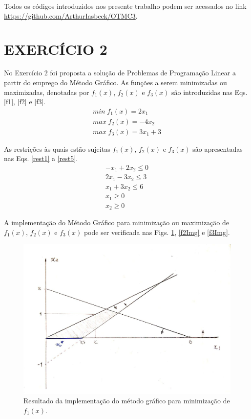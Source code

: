 \documentclass[12pt]{article}
\begin{document}
	Todos os códigos introduzidos nos presente trabalho podem ser acessados no link \url{https://github.com/ArthurIasbeck/OTMC3}.
	
	
	\section*{EXERCÍCIO 2}
	
	No Exercício 2 foi proposta a solução de Problemas de Programação Linear a partir do emprego do Método Gráfico. As funções a serem minimizadas ou maximizadas, denotadas por $ f_1(x) $, $ f_2(x) $ e $ f_3(x) $ são introduzidas nas Eqs. \ref{f1}, \ref{f2} e \ref{f3}. 
	\begin{gather}
		min \; f_1(x) = 2 x_1 \label{f1} \\
		max \; f_2(x) = -4 x_2 \label{f2} \\
		max \; f_3(x) = 3 x_1 + 3  \label{f3} 
	\end{gather} 
	
	As restrições às quais estão sujeitas $ f_1(x) $, $ f_2(x) $ e $ f_3(x) $ são apresentadas nas Eqs. \ref{rest1} a \ref{rest5}.
	\begin{gather}
		-x_1 + 2 x_2 \leq 0 \label{rest1} \\
		2 x_1 - 3 x_2 \leq 3 \label{rest2} \\
		x_1 + 3 x_2 \leq 6 \label{rest3} \\
		x_1 \geq 0 \label{rest4} \\
		x_2 \geq 0 \label{rest5} 
	\end{gather} 
	
	A implementação do Método Gráfico para minimização ou maximização de $ f_1(x) $, $ f_2(x) $ e $ f_3(x) $ pode ser verificada nas Figs. \ref{f1Img}, \ref{f2Img} e \ref{f3Img}.
	
	\begin{figure}[H]
		\centering
		\includegraphics[width=0.8\linewidth]{figuras/1.jpeg}
		\caption{Resultado da implementação do método gráfico para minimização de $ f_1(x) $. }
		\label{f1Img}
	\end{figure}
\end{document}
